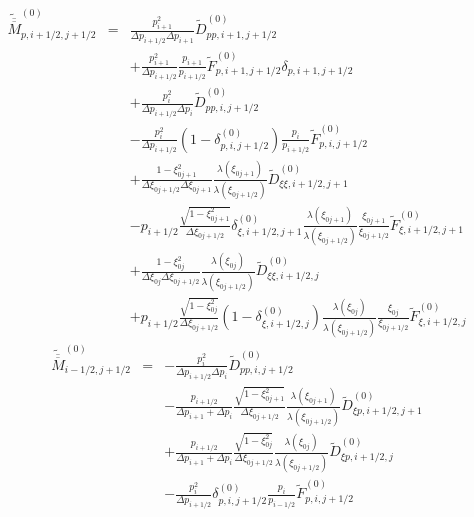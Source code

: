 \begin{eqnarray*}
\widetilde{\overline{\overline{M}}}_{p,i+1/2,j+1/2}^{\left(0\right)} & = & \frac{p_{i+1}^{2}}{\Delta p_{i+1/2}\Delta p_{i+1}}\widetilde{D}_{pp,i+1,j+1/2}^{\left(0\right)}\\
 &  & +\frac{p_{i+1}^{2}}{\Delta p_{i+1/2}}\frac{p_{i+1}}{p_{i+1/2}}\widetilde{F}_{p,i+1,j+1/2}^{\left(0\right)}\delta_{p,i+1,j+1/2}\\
 &  & +\frac{p_{i}^{2}}{\Delta p_{i+1/2}\Delta p_{i}}\widetilde{D}_{pp,i,j+1/2}^{\left(0\right)}\\
 &  & -\frac{p_{i}^{2}}{\Delta p_{i+1/2}}\left(1-\delta_{p,i,j+1/2}^{\left(0\right)}\right)\frac{p_{i}}{p_{i+1/2}}\widetilde{F}_{p,i,j+1/2}^{\left(0\right)}\\
 &  & +\frac{1-\xi_{0j+1}^{2}}{\Delta\xi_{0j+1/2}\Delta\xi_{0j+1}}\frac{\lambda\left(\xi_{0j+1}\right)}{\lambda\left(\xi_{0j+1/2}\right)}\widetilde{D}_{\xi\xi,i+1/2,j+1}^{\left(0\right)}\\
 &  & -p_{i+1/2}\frac{\sqrt{1-\xi_{0j+1}^{2}}}{\Delta\xi_{0j+1/2}}\delta_{\xi,i+1/2,j+1}^{\left(0\right)}\frac{\lambda\left(\xi_{0j+1}\right)}{\lambda\left(\xi_{0j+1/2}\right)}\frac{\xi_{0j+1}}{\xi_{0j+1/2}}\widetilde{F}_{\xi,i+1/2,j+1}^{\left(0\right)}\\
 &  & +\frac{1-\xi_{0j}^{2}}{\Delta\xi_{0j}\Delta\xi_{0j+1/2}}\frac{\lambda\left(\xi_{0j}\right)}{\lambda\left(\xi_{0j+1/2}\right)}\widetilde{D}_{\xi\xi,i+1/2,j}^{\left(0\right)}\\
 &  & +p_{i+1/2}\frac{\sqrt{1-\xi_{0j}^{2}}}{\Delta\xi_{0j+1/2}}\left(1-\delta_{\xi,i+1/2,j}^{\left(0\right)}\right)\frac{\lambda\left(\xi_{0j}\right)}{\lambda\left(\xi_{0j+1/2}\right)}\frac{\xi_{0j}}{\xi_{0j+1/2}}\widetilde{F}_{\xi,i+1/2,j}^{\left(0\right)}\end{eqnarray*}
\begin{eqnarray*}
\widetilde{\overline{\overline{M}}}_{i-1/2,j+1/2}^{\left(0\right)} & = & -\frac{p_{i}^{2}}{\Delta p_{i+1/2}\Delta p_{i}}\widetilde{D}_{pp,i,j+1/2}^{\left(0\right)}\\
 &  & -\frac{p_{i+1/2}}{\Delta p_{i+1}+\Delta p_{i}}\frac{\sqrt{1-\xi_{0j+1}^{2}}}{\Delta\xi_{0j+1/2}}\frac{\lambda\left(\xi_{0j+1}\right)}{\lambda\left(\xi_{0j+1/2}\right)}\widetilde{D}_{\xi p,i+1/2,j+1}^{\left(0\right)}\\
 &  & +\frac{p_{i+1/2}}{\Delta p_{i+1}+\Delta p_{i}}\frac{\sqrt{1-\xi_{0j}^{2}}}{\Delta\xi_{0j+1/2}}\frac{\lambda\left(\xi_{0j}\right)}{\lambda\left(\xi_{0j+1/2}\right)}\widetilde{D}_{\xi p,i+1/2,j}^{\left(0\right)}\\
 &  & -\frac{p_{i}^{2}}{\Delta p_{i+1/2}}\delta_{p,i,j+1/2}^{\left(0\right)}\frac{p_{i}}{p_{i-1/2}}\widetilde{F}_{p,i,j+1/2}^{\left(0\right)}\end{eqnarray*}
